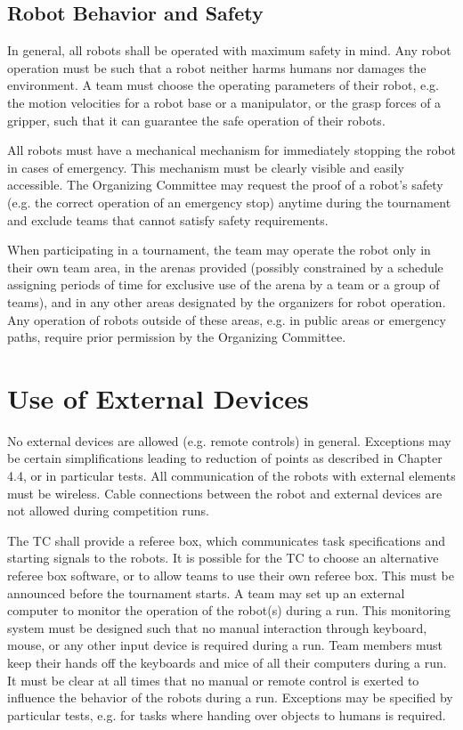 \subsection{Robot Behavior and Safety}
In general, all robots shall be operated with maximum safety in mind. Any robot operation must be such that a robot neither harms humans nor damages the environment. A team must choose the operating parameters of their robot, e.g. the motion velocities for a robot base or a manipulator, or the grasp forces of a gripper, such that it can guarantee the safe operation of their robots.
\par
All robots must have a mechanical mechanism for immediately stopping the robot in cases of emergency. This mechanism must be clearly visible and easily accessible. The Organizing Committee may request the proof of a robot’s safety (e.g. the correct operation of an emergency stop) anytime during the tournament and exclude teams that cannot satisfy safety requirements.
\par
When participating in a tournament, the team may operate the robot only in their own team area, in the arenas provided (possibly constrained by a schedule assigning periods of time for exclusive use of the arena by a team or a group of teams), and in any other areas designated by the organizers for robot operation. Any operation of robots outside of these areas, e.g. in public areas or emergency paths, require prior permission by the Organizing Committee.

\section{Use of External Devices}
No external devices are allowed (e.g. remote controls) in general. Exceptions may be certain simplifications leading to reduction of points as described in Chapter 4.4, or in particular tests. All communication of the robots with external elements must be wireless. Cable connections between the robot and external devices are not allowed during competition runs. 
\par
The TC shall provide a referee box, which communicates task specifications and starting signals to the robots. It is possible for the TC to choose an alternative referee box software, or to allow teams to use their own referee box. This must be announced before the tournament starts. 
A team may set up an external computer to monitor the operation of the robot(s) during a run. This monitoring system must be designed such that no manual interaction through keyboard, mouse, or any other input device is required during a run. Team members must keep their hands off the keyboards and mice of all their computers during a run.
It must be clear at all times that no manual or remote control is exerted to influence the behavior of the robots during a run. Exceptions may be specified by particular tests, e.g. for tasks where handing over objects to humans is required. 

